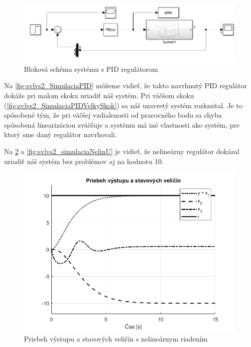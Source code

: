 \documentclass[../main.tex]{subfiles}
\begin{document}
	\begin{figure}[h!]
		\centering
		\includegraphics[width=0.8\linewidth]{ModelRiadeniaPID}
		\caption{Bloková schéma systému s PID regulátorom}
		\label{fig:svlvs2_modelRiadeniaPID}
	\end{figure}

Na \cref{fig:svlvs2_SimulaciaPID} môžeme vidieť, že takto navrhnutý PID regulátor dokáže pri malom skoku uriadiť náš systém. Pri väčšom skoku (\cref{fig:svlvs2_SimulaciaPIDVelkySkok}) sa náš uzavretý systém rozkmital. Je to spôsobené tým, že pri väčšej vzdialenosti od pracovného bodu sa chyba spôsobená linearizáciou zväčšuje a systému má iné vlastnosti ako systém, pre ktorý sme daný regulátor navrhovali.

Na \cref{fig:svlvs2_simulaciaNelin} a \cref{fig:svlvs2_simulaciaNelinU} je vidieť, že nelineárny regulátor dokázal uriadiť náš systém bez problémov aj na hodnotu 10.
	\begin{figure}[h!]
		\centering
		\includegraphics[width=0.8\linewidth]{SimulaciaNelin}
		\caption{Priebeh výstupu a stavových veličín s nelineárnym riadením}
		\label{fig:svlvs2_simulaciaNelin}
	\end{figure}
\end{document}
